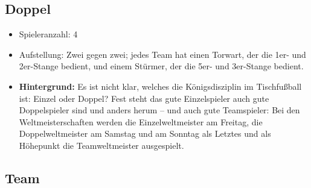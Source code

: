 \subsection{Doppel}
\label{spielformen:npersonen:doppel}

\begin{itemize}
\item Spieleranzahl: 4
\item Aufstellung: Zwei gegen zwei; jedes Team hat einen Torwart, der die 1er- und 2er-Stange bedient, und einem Stürmer, der die 5er- und 3er-Stange bedient.
\item {\bf Hintergrund:} Es ist nicht klar, welches die Königsdisziplin im Tischfußball ist: Einzel oder Doppel? Fest steht das gute Einzelspieler auch gute Doppelspieler sind und anders herum -- und auch gute Teamspieler: 
Bei den Weltmeisterschaften werden die Einzelweltmeister am Freitag, die Doppelweltmeister am Samstag und am Sonntag als Letztes und als Höhepunkt die Teamweltmeister ausgespielt. 
\end{itemize}

\subsection{Team}
\label{spielformen:npersonen:team}

